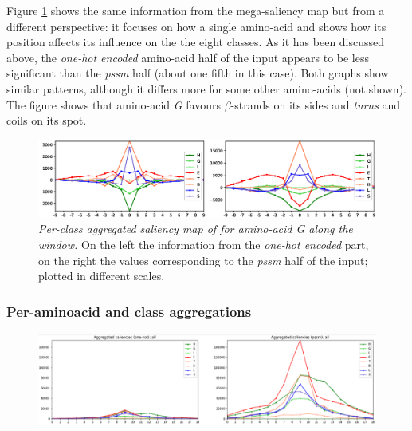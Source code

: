 		Figure \ref{fig:class_agg_aa} shows the same information from the mega-saliency map but from a different perspective: it focuses on how a single amino-acid and shows how its position affects its influence on the the eight classes. As it has been discussed above, the \textit{one-hot encoded} amino-acid half of the input appears to be less significant than the \textit{pssm} half (about one fifth in this case). Both graphs show similar patterns, although it differs more for some other amino-acids (not shown). The figure shows that amino-acid \textit{G} favours $\beta$-strands on its sides and \textit{turns} and coils on its spot. 
		
		\begin{figure}
			\centering
			\includegraphics[width=1\linewidth]{Figures/class_agg_aa}
			\caption{\textit{Per-class aggregated saliency map of for amino-acid G along the window.} On the left the information from the \textit{one-hot encoded} part, on the right the values corresponding to the \textit{pssm} half of the input; plotted in different scales.}
			\label{fig:class_agg_aa}
		\end{figure}



			\subsubsection*{Per-aminoacid and class aggregations}
			\begin{figure}
		\centering
		\includegraphics[width=1\linewidth]{Figures/per-class}
		\caption{}
		\label{fig:per-class}
		\end{figure}
			
